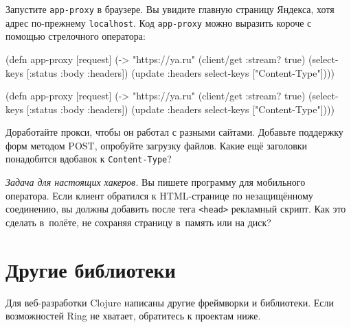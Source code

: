 \fi

Запустите \verb|app-proxy| в браузере. Вы увидите главную страницу Яндекса,
хотя адрес по-прежнему \verb|localhost|. Код \verb|app-proxy| можно выразить
короче с помощью стрелочного оператора:

\ifx\DEVICETYPE\MOBILE

\begin{english}
  \begin{clojure}
(defn app-proxy [request]
  (-> "https://ya.ru"
      (client/get {:stream? true})
      (select-keys [:status
                    :body :headers])
      (update :headers
        select-keys ["Content-Type"])))
  \end{clojure}
\end{english}

\else

\begin{english}
  \begin{clojure}
(defn app-proxy [request]
  (-> "https://ya.ru"
      (client/get {:stream? true})
      (select-keys [:status :body :headers])
      (update :headers select-keys ["Content-Type"])))
  \end{clojure}
\end{english}

\fi

Доработайте прокси, чтобы он работал с разными сайтами. Добавьте поддержку форм
методом POST, опробуйте загрузку файлов. Какие ещё заголовки понадобятся
вдобавок к \verb|Content-Type|?

\emph{Задача для настоящих хакеров.} Вы пишете программу для мобильного
оператора. Если клиент обратился к HTML-странице по незащищённому соединению, вы
должны добавить после тега \verb|<head>| рекламный скрипт. Как это сделать
в~полёте, не сохраняя страницу в~память или на диск?

\section{Другие библиотеки}

Для веб-разработки Clojure написаны другие фреймворки и библиотеки. Если
возможностей Ring не хватает, обратитесь к проектам ниже.

